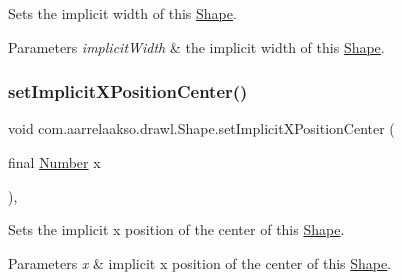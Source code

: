 Sets the implicit width of this \hyperlink{classcom_1_1aarrelaakso_1_1drawl_1_1_shape}{Shape}. 


\begin{DoxyParams}{Parameters}
{\em implicit\+Width} & the implicit width of this \hyperlink{classcom_1_1aarrelaakso_1_1drawl_1_1_shape}{Shape}. \\
\hline
\end{DoxyParams}
\mbox{\label{classcom_1_1aarrelaakso_1_1drawl_1_1_shape_a945597709a9d79688e48a9802c86b13b}} 
\subsubsection{\texorpdfstring{set\+Implicit\+X\+Position\+Center()}{setImplicitXPositionCenter()}}
{\footnotesize\ttfamily void com.\+aarrelaakso.\+drawl.\+Shape.\+set\+Implicit\+X\+Position\+Center (\begin{DoxyParamCaption}\item[{final \hyperlink{interfacecom_1_1aarrelaakso_1_1drawl_1_1_number}{Number}}]{x }\end{DoxyParamCaption})\hspace{0.3cm}{\ttfamily [protected]}, {\ttfamily [inherited]}}



Sets the implicit x position of the center of this \hyperlink{classcom_1_1aarrelaakso_1_1drawl_1_1_shape}{Shape}. 


\begin{DoxyParams}{Parameters}
{\em x} & implicit x position of the center of this \hyperlink{classcom_1_1aarrelaakso_1_1drawl_1_1_shape}{Shape}. \\
\hline
\end{DoxyParams}
\mbox{\label{classcom_1_1aarrelaakso_1_1drawl_1_1_shape_a79c79420c626b8b2d2534b6c9aa64d8f}} 
